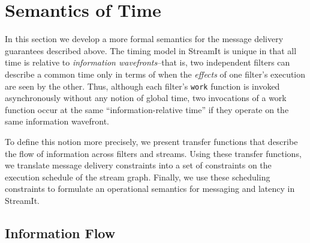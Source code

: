 \section{Semantics of Time}
\label{sec:time}
In this section we develop a more formal semantics for the message
delivery guarantees described above.  The timing model in StreamIt is
unique in that all time is relative to {\it information
wavefronts}--that is, two independent filters can describe a common
time only in terms of when the {\it effects} of one filter's execution
are seen by the other.  Thus, although each filter's {\tt work}
function is invoked asynchronously without any notion of global time,
two invocations of a work function occur at the same
``information-relative time'' if they operate on the same information
wavefront.

To define this notion more precisely, we present transfer functions
that describe the flow of information across filters and streams.
Using these transfer functions, we translate message delivery
constraints into a set of constraints on the execution schedule of the
stream graph.  Finally, we use these scheduling constraints to
formulate an operational semantics for messaging and latency in
StreamIt.

\subsection{Information Flow}

